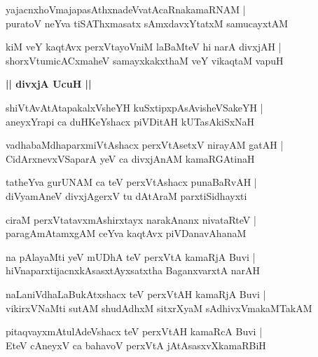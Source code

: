 \documentclass[twoside,12pt,openright]{book}
\newcounter{shloka}[chapter]
\def\uvaca#1{\centerline{{\large\textbf{#1}}}}
\begin{document}
\begin{shloka}%
yajacnxhoVmajapasAthxnadeVvatAcaRnakamaRNAM |\\
puratoV neYva tiSAThxmasatx sAmxdavxYtatxM samucayxtAM 
\end{shloka}

\begin{shloka}%
kiM veY kaqtAvx perxVtayoVniM laBaMteV hi narA divxjAH |\\
shorxVtumicACxmaheV samayxkakxthaM veY vikaqtaM vapuH
\end{shloka}

\uvaca{|| divxjA UcuH ||}

\begin{shloka}%
shiVtAvAtAtapakalxVsheYH kuSxtipxpAsAvisheVSakeYH |\\
aneyxYrapi ca duHKeYshacx piVDitAH kUTasAkiSxNaH 
\end{shloka}

\begin{shloka}%
vadhabaMdhaparxmiVtAshacx perxVtAsetxV nirayAM gatAH |\\
CidArxnevxVSaparA yeV ca divxjAnAM kamaRGAtinaH 
\end{shloka}

\begin{shloka}%
tatheYva gurUNAM ca teV perxVtAshacx punaBaRvAH |\\
diVyamAneV divxjAgerxV tu dAtAraM parxtiSidhayxti 
\end{shloka}

\begin{shloka}%
ciraM perxVtatavxmAshirxtayx narakAnanx nivataRteV |\\
paragAmAtamxgAM ceYva kaqtAvx piVDanavAhanaM 
\end{shloka}

\begin{shloka}%
na pAlayaMti yeV mUDhA teV perxVtA kamaRjA Buvi |\\
hiVnaparxtijacnxkAsasxtAyxsatxtha BaganxvarxtA narAH 
\end{shloka}

\begin{shloka}%
naLaniVdhaLaBukAtxshacx teV perxVtAH kamaRjA Buvi |\\
vikirxVNaMti sutAM shudAdhxM sitxrXyaM sAdhivxVmakaMTakAM 
\end{shloka}

\begin{shloka}%
pitaqvayxmAtulAdeVshacx teV perxVtAH kamaRcA Buvi |\\
EteV cAneyxV ca bahavoV perxVtA jAtAsasxvXkamaRBiH 
\end{shloka}
\end{document}
